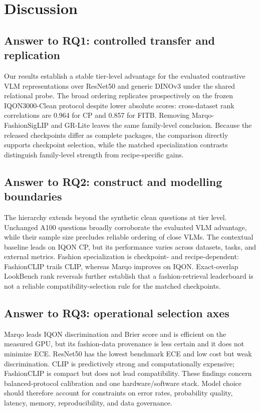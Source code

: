 \documentclass[pdflatex,sn-mathphys-num,iicol]{sn-jnl}
\begin{document}
\section{Discussion}\label{sec:discussion}

\subsection{Answer to RQ1: controlled transfer and replication}

Our results establish a stable tier-level advantage for the evaluated contrastive VLM representations over ResNet50 and generic DINOv3 under the shared relational probe. The broad ordering replicates prospectively on the frozen IQON3000-Clean protocol despite lower absolute scores: cross-dataset rank correlations are 0.964 for CP and 0.857 for FITB. Removing Marqo-FashionSigLIP and GR-Lite leaves the same family-level conclusion. Because the released checkpoints differ as complete packages, the comparison directly supports checkpoint selection, while the matched specialization contrasts distinguish family-level strength from recipe-specific gains.

\subsection{Answer to RQ2: construct and modelling boundaries}

The hierarchy extends beyond the synthetic clean questions at tier level. Unchanged A100 questions broadly corroborate the evaluated VLM advantage, while their sample size precludes reliable ordering of close VLMs. The contextual baseline leads on IQON CP, but its performance varies across datasets, tasks, and external metrics. Fashion specialization is checkpoint- and recipe-dependent: FashionCLIP trails CLIP, whereas Marqo improves on IQON. Exact-overlap LookBench rank reversals further establish that a fashion-retrieval leaderboard is not a reliable compatibility-selection rule for the matched checkpoints.

\subsection{Answer to RQ3: operational selection axes}

Marqo leads IQON discrimination and Brier score and is efficient on the measured GPU, but its fashion-data provenance is less certain and it does not minimize ECE. ResNet50 has the lowest benchmark ECE and low cost but weak discrimination. CLIP is predictively strong and computationally expensive; FashionCLIP is compact but does not lead compatibility. These findings concern balanced-protocol calibration and one hardware/software stack. Model choice should therefore account for constraints on error rates, probability quality, latency, memory, reproducibility, and data governance.
\end{document}
